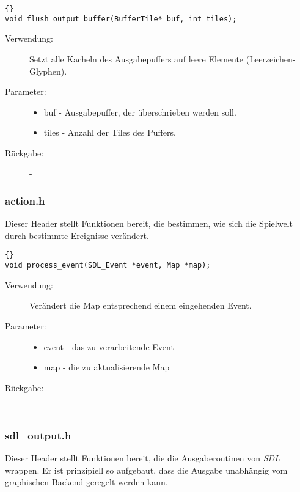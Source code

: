 \documentclass[11pt,a4paper,notitlepage]{report}
\begin{document}
		\begin{lstlisting}[caption=flush\_output\_buffer]{}
void flush_output_buffer(BufferTile* buf, int tiles);
		\end{lstlisting}
		
	\begin{description}
		\item[Verwendung:] Setzt alle Kacheln des Ausgabepuffers auf leere Elemente (Leerzeichen-Glyphen).
		\item[Parameter:] \hfill
		\begin{itemize}
			\item buf - Ausgabepuffer, der überschrieben werden soll.
			\item tiles - Anzahl der Tiles des Puffers.
		\end{itemize}
		\item[Rückgabe:] -
	\end{description}

	\newpage
	\subsubsection*{action.h}
	Dieser Header stellt Funktionen bereit, die bestimmen, wie sich die Spielwelt durch bestimmte Ereignisse verändert.

		\begin{lstlisting}[caption=process\_event]{}
void process_event(SDL_Event *event, Map *map);
		\end{lstlisting}
	\begin{description}
		\item[Verwendung:] Verändert die Map entsprechend einem eingehenden Event.
		\item[Parameter:] \hfill
		\begin{itemize}
			\item event - das zu verarbeitende Event
			\item map - die zu aktualisierende Map
		\end{itemize}
		\item[Rückgabe:] -
	\end{description}

	\newpage
	\subsubsection*{sdl\_output.h}
	Dieser Header stellt Funktionen bereit, die die Ausgaberoutinen von \textit{SDL} wrappen. Er ist prinzipiell so aufgebaut, dass die Ausgabe unabhängig vom graphischen Backend geregelt werden kann.
	
\end{document}
